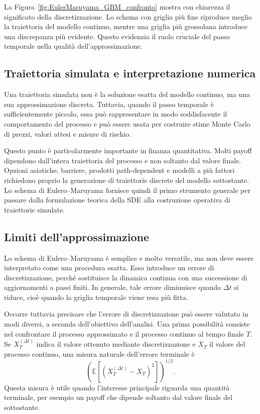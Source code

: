 La Figura~\ref{fig:EulerMaruyama_GBM_confronto} mostra con chiarezza il
significato della discretizzazione. Lo schema con griglia pi\`{u} fine
riproduce meglio la traiettoria del modello continuo, mentre una griglia
pi\`{u} grossolana introduce una discrepanza pi\`{u} evidente. Questo
evidenzia il ruolo cruciale del passo temporale nella qualit\`{a}
dell'approssimazione.

\subsection*{Traiettoria simulata e interpretazione numerica}

Una traiettoria simulata non \`{e} la soluzione esatta del modello
continuo, ma una sua approssimazione discreta. Tuttavia, quando il passo
temporale \`{e} sufficientemente piccolo, essa pu\`{o} rappresentare in
modo soddisfacente il comportamento del processo e pu\`{o} essere usata
per costruire stime Monte Carlo di prezzi, valori attesi e misure di
rischio.

Questo punto \`{e} particolarmente importante in finanza quantitativa.
Molti payoff dipendono dall'intera traiettoria del processo e non soltanto
dal valore finale. Opzioni asiatiche, barriere, prodotti path-dependent e
modelli a pi\`{u} fattori richiedono proprio la generazione di traiettorie
discrete del modello sottostante. Lo schema di Eulero--Maruyama fornisce
quindi il primo strumento generale per passare dalla formulazione teorica
della SDE alla costruzione operativa di traiettorie simulate.

\subsection*{Limiti dell'approssimazione}

Lo schema di Eulero--Maruyama \`{e} semplice e molto versatile, ma non
deve essere interpretato come una procedura esatta. Esso introduce un
errore di discretizzazione, perch\'{e} sostituisce la dinamica continua
con una successione di aggiornamenti a passi finiti. In generale, tale
errore diminuisce quando $\Delta t$ si riduce, cio\`{e} quando la griglia
temporale viene resa pi\`{u} fitta.

Occorre tuttavia precisare che l'errore di discretizzazione pu\`{o}
essere valutato in modi diversi, a seconda dell'obiettivo dell'analisi.
Una prima possibilit\`{a} consiste nel confrontare il processo
approssimato e il processo continuo al tempo finale $T$. Se
$X_T^{(\Delta t)}$ indica il valore ottenuto mediante discretizzazione e
$X_T$ il valore del processo continuo, una misura naturale dell'errore
terminale \`{e}
\[
\left(
\mathbb{E}\left[
\left(
X_T^{(\Delta t)}-X_T
\right)^2
\right]
\right)^{1/2}.
\]
Questa misura \`{e} utile quando l'interesse principale riguarda una
quantit\`{a} terminale, per esempio un payoff che dipende soltanto dal
valore finale del sottostante.

